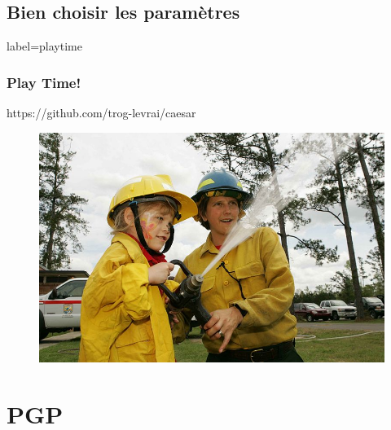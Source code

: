 \documentclass{beamer}
\begin{document}
    \subsection{Bien choisir les paramètres}
        \begin{frame}{label=playtime}
            \frametitle{Play Time!}
            \begin{center}
                https://github.com/trog-levrai/caesar
                \begin{figure}
                    \includegraphics[scale=0.35]{img/playtime.jpg}
                \end{figure}
            \end{center}
        \end{frame}
    \section{PGP}
\end{document}
